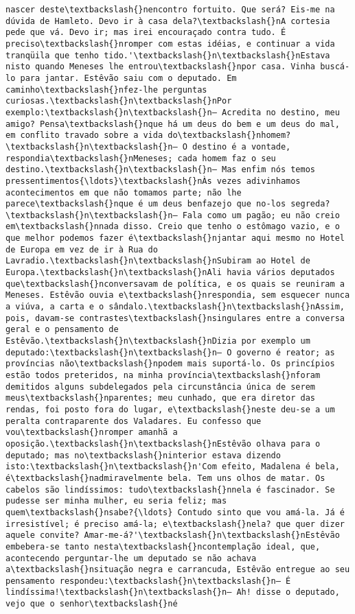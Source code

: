 \documentclass[11pt]{article}
\begin{document}
\begin{Verbatim}[commandchars=\\\{\}]
nascer deste\textbackslash{}nencontro fortuito. Que será? Eis-me na dúvida de Hamleto. Devo ir à casa dela?\textbackslash{}nA cortesia pede que vá. Devo ir; mas irei encouraçado contra tudo. É preciso\textbackslash{}nromper com estas idéias, e continuar a vida tranqüila que tenho tido.'\textbackslash{}n\textbackslash{}nEstava nisto quando Meneses lhe entrou\textbackslash{}npor casa. Vinha buscá-lo para jantar. Estêvão saiu com o deputado. Em caminho\textbackslash{}nfez-lhe perguntas curiosas.\textbackslash{}n\textbackslash{}nPor exemplo:\textbackslash{}n\textbackslash{}n— Acredita no destino, meu amigo? Pensa\textbackslash{}nque há um deus do bem e um deus do mal, em conflito travado sobre a vida do\textbackslash{}nhomem?\textbackslash{}n\textbackslash{}n— O destino é a vontade, respondia\textbackslash{}nMeneses; cada homem faz o seu destino.\textbackslash{}n\textbackslash{}n— Mas enfim nós temos pressentimentos{\ldots}\textbackslash{}nÀs vezes adivinhamos acontecimentos em que não tomamos parte; não lhe parece\textbackslash{}nque é um deus benfazejo que no-los segreda?\textbackslash{}n\textbackslash{}n— Fala como um pagão; eu não creio em\textbackslash{}nnada disso. Creio que tenho o estômago vazio, e o que melhor podemos fazer é\textbackslash{}njantar aqui mesmo no Hotel de Europa em vez de ir à Rua do Lavradio.\textbackslash{}n\textbackslash{}nSubiram ao Hotel de Europa.\textbackslash{}n\textbackslash{}nAli havia vários deputados que\textbackslash{}nconversavam de política, e os quais se reuniram a Meneses. Estêvão ouvia e\textbackslash{}nrespondia, sem esquecer nunca a viúva, a carta e o sândalo.\textbackslash{}n\textbackslash{}nAssim, pois, davam-se contrastes\textbackslash{}nsingulares entre a conversa geral e o pensamento de Estêvão.\textbackslash{}n\textbackslash{}nDizia por exemplo um deputado:\textbackslash{}n\textbackslash{}n— O governo é reator; as províncias não\textbackslash{}npodem mais suportá-lo. Os princípios estão todos preteridos, na minha província\textbackslash{}nforam demitidos alguns subdelegados pela circunstância única de serem meus\textbackslash{}nparentes; meu cunhado, que era diretor das rendas, foi posto fora do lugar, e\textbackslash{}neste deu-se a um peralta contraparente dos Valadares. Eu confesso que vou\textbackslash{}nromper amanhã a oposição.\textbackslash{}n\textbackslash{}nEstêvão olhava para o deputado; mas no\textbackslash{}ninterior estava dizendo isto:\textbackslash{}n\textbackslash{}n'Com efeito, Madalena é bela, é\textbackslash{}nadmiravelmente bela. Tem uns olhos de matar. Os cabelos são lindíssimos: tudo\textbackslash{}nnela é fascinador. Se pudesse ser minha mulher, eu seria feliz; mas quem\textbackslash{}nsabe?{\ldots} Contudo sinto que vou amá-la. Já é irresistível; é preciso amá-la; e\textbackslash{}nela? que quer dizer aquele convite? Amar-me-á?'\textbackslash{}n\textbackslash{}nEstêvão embebera-se tanto nesta\textbackslash{}ncontemplação ideal, que, acontecendo perguntar-lhe um deputado se não achava a\textbackslash{}nsituação negra e carrancuda, Estêvão entregue ao seu pensamento respondeu:\textbackslash{}n\textbackslash{}n— É lindíssima!\textbackslash{}n\textbackslash{}n— Ah! disse o deputado, vejo que o senhor\textbackslash{}né 
\end{Verbatim}
\end{document}
